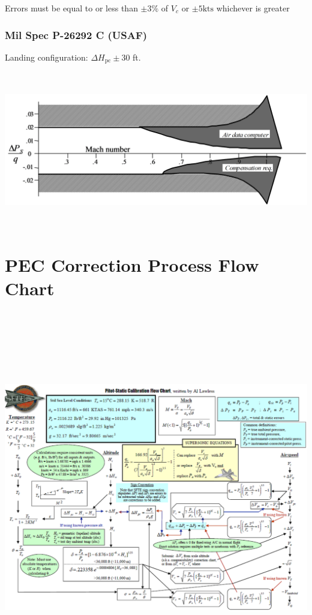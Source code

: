 \documentclass[
]{book}
\begin{document}
Errors must be equal to or less than \(\pm3\%\) of \(V_c\) or \(\pm5\text{kts}\) whichever is greater

\hypertarget{mil-spec-p-26292-c-usaf}{%
\subsubsection*{Mil Spec P-26292 C (USAF)}\label{mil-spec-p-26292-c-usaf}}

Landing configuration: \(\Delta H_{\mathrm{pc}} \pm 30\) ft.

\includegraphics[width=5.75in,height=2.6875in]{media/04/image50.svg}

\hypertarget{pec-correction-process-flow-chart}{%
\section{PEC Correction Process Flow Chart}\label{pec-correction-process-flow-chart}}

\includegraphics[width=8.63072in,height=6.4465in]{media/04/image52.svg}
\end{document}

